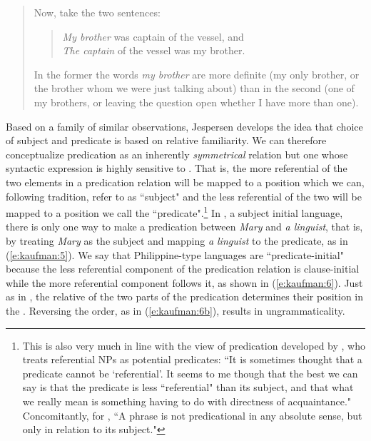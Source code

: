 \documentclass[output=paper]{langsci/langscibook}
\begin{document}
\begin{quote}\small
	\glt Now, take the two sentences:　
	\begin{quote}
	\textit{My brother} was captain of the vessel, and\\
	\textit{The captain} of the vessel was my brother.
	\end{quote}
	In the former the words \textit{my brother} are more definite (my only brother, or the brother whom we were just talking about) than in the second (one of my brothers, or leaving the question open whether I have more than one). \citep[:153]{Jespersen:1965}
\end{quote}

\noindent
Based on a family of similar observations, Jespersen develops the idea that choice of subject and predicate is based on relative familiarity. We can therefore conceptualize predication as an inherently \emph{symmetrical} relation but one whose syntactic expression is highly sensitive to . That is, the more referential of the two elements in a predication relation will be mapped to a position which we can, following tradition, refer to as ``subject" and the less referential of the two will be mapped to a position we call the ``predicate".\footnote{This is also very much in line with the view of predication developed by \citet[331]{Williams:1997a}, who treats referential NPs as potential predicates: ``It is sometimes thought that a predicate cannot be `referential'. It seems to me though that the best we can say is that the predicate is less ``referential" than its subject, and that what we really mean is something having to do with directness of acquaintance." Concomitantly, for \citet[323]{Williams:1997a}, ``A phrase is not predicational in any absolute sense, but only in relation to its subject."} In , a subject initial language, there is only one way to make a predication between \textit{Mary} and \textit{a linguist}, that is, by treating \textit{Mary} as the subject and mapping \textit{a linguist} to the predicate, as in (\ref{e:kaufman:5}).  We say that Philippine-type languages are ``predicate-initial" because the less referential component of the predication relation is clause-initial while the more referential component follows it, as shown in (\ref{e:kaufman:6}). Just as in , the relative  of the two parts of the predication determines their position in the . Reversing the order, as in (\ref{e:kaufman:6b}), results in ungrammaticality.
\end{document}
